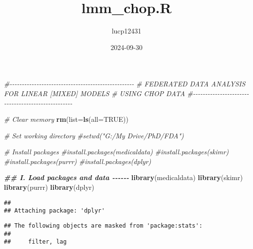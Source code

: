 \documentclass[
]{article}
\title{lmm\_chop.R}
\author{lucp12431}
\date{2024-09-30}
\newenvironment{Shaded}{\begin{snugshade}}{\end{snugshade}}
\newcommand{\AttributeTok}[1]{\textcolor[rgb]{0.13,0.29,0.53}{#1}}
\newcommand{\CommentTok}[1]{\textcolor[rgb]{0.56,0.35,0.01}{\textit{#1}}}
\newcommand{\ConstantTok}[1]{\textcolor[rgb]{0.56,0.35,0.01}{#1}}
\newcommand{\DocumentationTok}[1]{\textcolor[rgb]{0.56,0.35,0.01}{\textbf{\textit{#1}}}}
\newcommand{\FunctionTok}[1]{\textcolor[rgb]{0.13,0.29,0.53}{\textbf{#1}}}
\newcommand{\NormalTok}[1]{#1}
\begin{document}
\maketitle

\begin{Shaded}
\begin{Highlighting}[]
\CommentTok{\#{-}{-}{-}{-}{-}{-}{-}{-}{-}{-}{-}{-}{-}{-}{-}{-}{-}{-}{-}{-}{-}{-}{-}{-}{-}{-}{-}{-}{-}{-}{-}{-}{-}{-}{-}{-}{-}{-}{-}{-}{-}{-}{-}{-}{-}{-}{-}{-}{-}{-}{-}}
\CommentTok{\# FEDERATED DATA ANALYSIS FOR LINEAR [MIXED] MODELS}
\CommentTok{\# USING CHOP DATA}
\CommentTok{\#{-}{-}{-}{-}{-}{-}{-}{-}{-}{-}{-}{-}{-}{-}{-}{-}{-}{-}{-}{-}{-}{-}{-}{-}{-}{-}{-}{-}{-}{-}{-}{-}{-}{-}{-}{-}{-}{-}{-}{-}{-}{-}{-}{-}{-}{-}{-}{-}{-}{-}{-} }
\end{Highlighting}
\end{Shaded}

\begin{Shaded}
\begin{Highlighting}[]
\CommentTok{\# Clear memory}
\FunctionTok{rm}\NormalTok{(}\AttributeTok{list=}\FunctionTok{ls}\NormalTok{(}\AttributeTok{all=}\ConstantTok{TRUE}\NormalTok{))}

\CommentTok{\# Set working directory}
\CommentTok{\#setwd("G:/My Drive/PhD/FDA")}
\end{Highlighting}
\end{Shaded}

\begin{Shaded}
\begin{Highlighting}[]
\CommentTok{\# Install packages}
\CommentTok{\#install.packages(\textquotesingle{}medicaldata\textquotesingle{})}
\CommentTok{\#install.packages(\textquotesingle{}skimr\textquotesingle{})}
\CommentTok{\#install.packages(\textquotesingle{}purrr\textquotesingle{})}
\CommentTok{\#install.packages(\textquotesingle{}dplyr\textquotesingle{})}

\DocumentationTok{\#\# I. Load packages and data {-}{-}{-}{-}{-}{-}}
\FunctionTok{library}\NormalTok{(medicaldata)}
\FunctionTok{library}\NormalTok{(skimr)}
\FunctionTok{library}\NormalTok{(purrr)}
\FunctionTok{library}\NormalTok{(dplyr)}
\end{Highlighting}
\end{Shaded}

\begin{verbatim}
## 
## Attaching package: 'dplyr'
\end{verbatim}

\begin{verbatim}
## The following objects are masked from 'package:stats':
## 
##     filter, lag
\end{verbatim}
\end{document}
